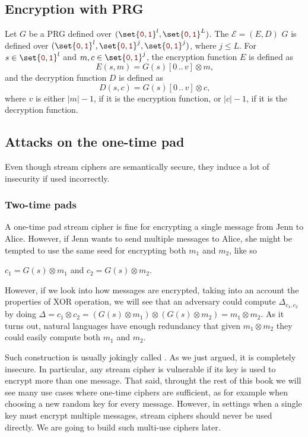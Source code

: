 \documentclass[a4paper,10pt]{article}
\newcommand{\cll}[1]{\mathcal{#1}}
\newcommand{\xor}{\otimes}
\newcommand{\arri}[2]{[#1\,..\,#2]}
\newcommand{\mtt}[1]{{\color{darkred} \mathtt{#1}}}
\begin{document}
\subsection{Encryption with PRG}
Let $G$ be a PRG defined over $(\set{\mtt{0},\mtt{1}}^l,\set{\mtt{0},\mtt{1}}^L)$.
The  $\cll{E} = (E,D)$  $G$ is defined
over $(\set{\mtt{0},\mtt{1}}^l,\set{\mtt{0},\mtt{1}}^j,\set{\mtt{0},\mtt{1}}^j)$,
where $j \leq L$. For $s \in \set{\mtt{0},\mtt{1}}^l$ and $m,c \in \set{\mtt{0},\mtt{1}}^j$,
the encryption function $E$ is defined as \[
  E(s,m) = G(s)\arri{0}{v} \xor m \text{,}
\] and the decryption function $D$ is defined as \[
  D(s,c) = G(s)\arri{0}{v} \xor c \text{,}
\]
where $v$ is either $|m| - 1$, if it is the encryption function, or $|c| - 1$,
if it is the decryption function.

\subsection{Attacks on the one-time pad}
Even though stream ciphers are semantically secure, they induce a lot of insecurity
if used incorrectly.

\subsubsection{Two-time pads}
A one-time pad stream cipher is fine for encrypting a single message from Jenn
to Alice. However, if Jenn wants to send multiple messages to Alice, she might
be tempted to use the same seed for encrypting both $m_1$ and $m_2$, like so
\begin{center}
  \(c_1 = G(s) \xor m_1\) and \(c_2 = G(s) \xor m_2\).
\end{center}
However, if we look into how messages are encrypted, taking into an account the
properties of XOR operation, we will see that an adversary could compute $\Delta_{c_1,c_2}$
by doing $\Delta = c_1 \xor c_2 = (G(s) \xor m_1) \xor (G(s) \xor m_2) = m_1 \xor m_2$.
As it turns out, natural languages have enough redundancy that given $m_1 \xor m_2$
they could easily compute both $m_1$ and $m_2$.

Such construction is usually jokingly called . As we just argued,
it is completely insecure. In particular, any stream cipher is vulnerable if
its key is used to encrypt more than one message. That said, throught the rest
of this book we will see many use cases where one-time ciphers are sufficient,
as for example when choosing a new random key for every message. However, in
settings when a single key must encrypt multiple messages, stream ciphers should
never be used directly. We are going to build such multi-use ciphers later.
\end{document}
